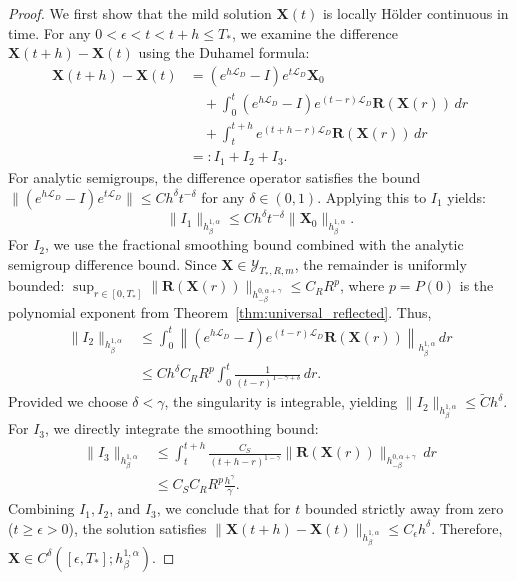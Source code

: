 \documentclass{amsart}
\begin{document}
\begin{proof}
We first show that the mild solution $\mathbf{X}(t)$ is locally Hölder continuous in time. For any $0 < \epsilon < t < t+h \le T_*$, we examine the difference $\mathbf{X}(t+h) - \mathbf{X}(t)$ using the Duhamel formula:
\begin{align*}
\mathbf{X}(t+h) - \mathbf{X}(t) &= \left( e^{h\mathcal{L}_D} - I \right) e^{t\mathcal{L}_D} \mathbf{X}_0 \\
&\quad + \int_0^t \left( e^{h\mathcal{L}_D} - I \right) e^{(t-r)\mathcal{L}_D} \mathbf{R}(\mathbf{X}(r)) \, dr \\
&\quad + \int_t^{t+h} e^{(t+h-r)\mathcal{L}_D} \mathbf{R}(\mathbf{X}(r)) \, dr \\
&=: I_1 + I_2 + I_3.
\end{align*}
For analytic semigroups, the difference operator satisfies the bound $\|(e^{h\mathcal{L}_D} - I) e^{t\mathcal{L}_D}\| \le C h^\delta t^{-\delta}$ for any $\delta \in (0,1)$. Applying this to $I_1$ yields:
\[
\|I_1\|_{h^{1,\alpha}_\beta} \le C h^\delta t^{-\delta} \|\mathbf{X}_0\|_{h^{1,\alpha}_\beta}.
\]
For $I_2$, we use the fractional smoothing bound combined with the analytic semigroup difference bound. Since $\mathbf{X} \in \mathcal{Y}_{T_*, R, m}$, the remainder is uniformly bounded: $\sup_{r \in [0,T_*]} \|\mathbf{R}(\mathbf{X}(r))\|_{h^{0,\alpha+\gamma}_{-\beta}} \le C_R R^p$, where $p = P(0)$ is the polynomial exponent from Theorem~\ref{thm:universal_reflected}. Thus,
\begin{align*}
\|I_2\|_{h^{1,\alpha}_\beta} &\le \int_0^t \left\| (e^{h\mathcal{L}_D} - I) e^{(t-r)\mathcal{L}_D} \mathbf{R}(\mathbf{X}(r)) \right\|_{h^{1,\alpha}_\beta} \, dr \\
&\le C h^\delta C_R R^p \int_0^t \frac{1}{(t-r)^{1-\gamma+\delta}} \, dr.
\end{align*}
Provided we choose $\delta < \gamma$, the singularity is integrable, yielding $\|I_2\|_{h^{1,\alpha}_\beta} \le \widetilde{C} h^\delta$. 
For $I_3$, we directly integrate the smoothing bound:
\begin{align*}
\|I_3\|_{h^{1,\alpha}_\beta} &\le \int_t^{t+h} \frac{C_S}{(t+h-r)^{1-\gamma}} \|\mathbf{R}(\mathbf{X}(r))\|_{h^{0,\alpha+\gamma}_{-\beta}} \, dr \\
&\le C_S C_R R^p \frac{h^\gamma}{\gamma}.
\end{align*}
Combining $I_1, I_2$, and $I_3$, we conclude that for $t$ bounded strictly away from zero ($t \ge \epsilon > 0$), the solution satisfies $\|\mathbf{X}(t+h) - \mathbf{X}(t)\|_{h^{1,\alpha}_\beta} \le C_\epsilon h^\delta$. Therefore, $\mathbf{X} \in C^\delta([\epsilon, T_*]; h^{1,\alpha}_\beta)$.


\end{proof}
\end{document}
